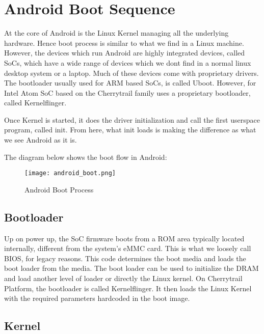

\section{Android Boot Sequence}
\label{android_boot}


\hspace{8mm} 

\noindent At the core of Android is the Linux Kernel managing all the underlying hardware. Hence boot process is
similar to what we find in a Linux machine. However, the devices which run Android are highly
integrated devices, called SoCs, which have a wide range of devices which we dont find in
a normal linux desktop system or a laptop. Much of these devices come with proprietary drivers.
The bootloader usually used for ARM based SoCs, is called Uboot. However, for Intel Atom SoC
based on the Cherrytrail family uses a proprietary bootloader, called Kernelflinger.

Once Kernel is started, it does the driver initialization and call the first userspace program,
called init. From here, what init loads is making the difference as what we see Android as it is.

The diagram below shows the boot flow in Android:


\begin{figure}[h]
  \centering
    \texttt{[image: android\_boot.png]}
    \caption{Android Boot Process}
    \label{fig:android_boot}
\end{figure}

\clearpage
\subsection{Bootloader}

Up on power up, the SoC firmware boots from a ROM area typically located internally,
different from the system's eMMC card. This is what we loosely call BIOS, for legacy
reasons. This code determines the boot media and loads the boot loader from the media.
The boot loader can be used to initialize the DRAM and load another level of loader
or directly the Linux kernel. On Cherrytrail Platform, the bootloader is called Kernelflinger.
It then loads the Linux Kernel with the required parameters hardcoded in the boot image.

\subsection{Kernel}


